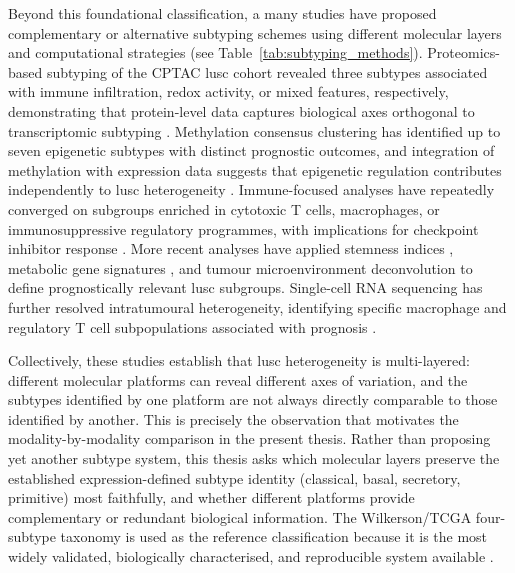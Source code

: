 Beyond this foundational classification, a many studies have  proposed complementary or alternative subtyping schemes  using different molecular layers and computational strategies \parencite{Bhandari2026scoping} (see Table~\ref{tab:subtyping_methods}). Proteomics-based subtyping of the CPTAC \gls{lusc} cohort revealed three subtypes associated with immune infiltration, redox activity, or mixed features, respectively, demonstrating that protein-level data captures biological axes orthogonal to transcriptomic subtyping \parencite{Stewart2019}. Methylation consensus clustering has identified up to seven epigenetic subtypes with distinct prognostic outcomes, and integration of methylation with expression data suggests that epigenetic regulation contributes independently to \gls{lusc} heterogeneity \parencite{Li2021methylation}. Immune-focused analyses have repeatedly converged on subgroups enriched in cytotoxic T cells, macrophages, or immunosuppressive regulatory programmes, with implications for checkpoint inhibitor response \parencite{Yang2022immune, Zhang2022}. More recent analyses have applied stemness indices \parencite{Lai2023stemness}, metabolic gene signatures \parencite{Ma2023metabolism, Chen2023lactate}, and tumour microenvironment deconvolution \parencite{Duan2025} to define prognostically relevant \gls{lusc} subgroups. Single-cell RNA sequencing has further resolved intratumoural heterogeneity, identifying specific macrophage and regulatory T cell subpopulations associated with prognosis \parencite{Wu2023scRNA}.
 
Collectively, these studies establish that \gls{lusc} heterogeneity is multi-layered: different molecular platforms can reveal different axes of  variation, and the subtypes identified by one platform are not always directly comparable to those identified by another. This is precisely the observation that motivates the modality-by-modality comparison in the present thesis. Rather than proposing yet another subtype system, this thesis asks which molecular layers preserve the established expression-defined subtype identity (classical, basal, secretory, primitive) most faithfully, and whether different platforms provide complementary or redundant biological information. The Wilkerson/TCGA four-subtype taxonomy is used as the reference classification because it is the most widely validated, biologically characterised, and reproducible system available \parencite{Wilkerson2010, Hammerman2012}.

 
